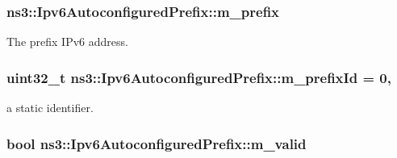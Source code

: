 \subsubsection[{\texorpdfstring{m\+\_\+prefix}{m_prefix}}]{ ns3\+::\+Ipv6\+Autoconfigured\+Prefix\+::m\+\_\+prefix\hspace{0.3cm}{\ttfamily [private]}}\hypertarget{classns3_1_1Ipv6AutoconfiguredPrefix_a2a821cc9ffe1337f8e27bc065f157213}{}\label{classns3_1_1Ipv6AutoconfiguredPrefix_a2a821cc9ffe1337f8e27bc065f157213}


The prefix I\+Pv6 address. 

\subsubsection[{\texorpdfstring{m\+\_\+prefix\+Id}{m_prefixId}}]{\setlength{\rightskip}{0pt plus 5cm}uint32\+\_\+t ns3\+::\+Ipv6\+Autoconfigured\+Prefix\+::m\+\_\+prefix\+Id = 0\hspace{0.3cm}{\ttfamily [static]}, {\ttfamily [private]}}\hypertarget{classns3_1_1Ipv6AutoconfiguredPrefix_a782d19dbdda32144f3a944c235cc86f0}{}\label{classns3_1_1Ipv6AutoconfiguredPrefix_a782d19dbdda32144f3a944c235cc86f0}


a static identifier. 

\subsubsection[{\texorpdfstring{m\+\_\+valid}{m_valid}}]{\setlength{\rightskip}{0pt plus 5cm}bool ns3\+::\+Ipv6\+Autoconfigured\+Prefix\+::m\+\_\+valid\hspace{0.3cm}{\ttfamily [private]}}\hypertarget{classns3_1_1Ipv6AutoconfiguredPrefix_ab230819ea4f73287c3c6df3700bb0579}{}\label{classns3_1_1Ipv6AutoconfiguredPrefix_ab230819ea4f73287c3c6df3700bb0579}


